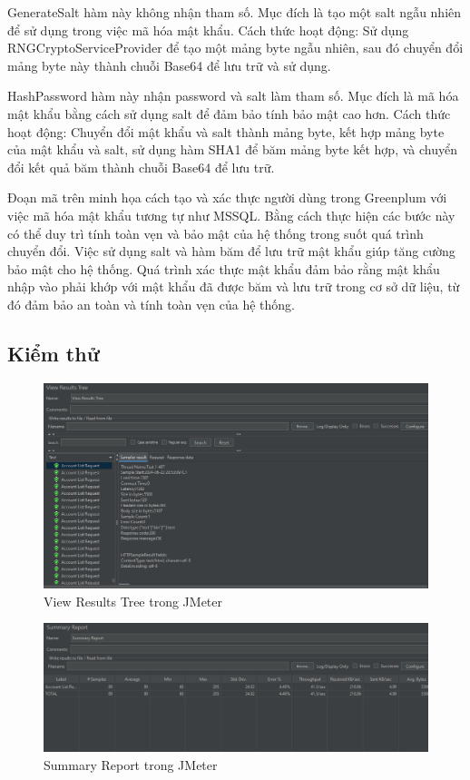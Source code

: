 \documentclass[14pt]{article}
\begin{document}
GenerateSalt hàm này không nhận tham số. Mục đích là tạo một salt ngẫu nhiên để sử dụng trong việc mã hóa mật khẩu. Cách thức hoạt động: Sử dụng RNGCryptoServiceProvider để tạo một mảng byte ngẫu nhiên, sau đó chuyển đổi mảng byte này thành chuỗi Base64 để lưu trữ và sử dụng.


HashPassword hàm này nhận password và salt làm tham số. Mục đích là mã hóa mật khẩu bằng cách sử dụng salt để đảm bảo tính bảo mật cao hơn. Cách thức hoạt động: Chuyển đổi mật khẩu và salt thành mảng byte, kết hợp mảng byte của mật khẩu và salt, sử dụng hàm SHA1 để băm mảng byte kết hợp, và chuyển đổi kết quả băm thành chuỗi Base64 để lưu trữ.

Đoạn mã trên minh họa cách tạo và xác thực người dùng trong Greenplum với việc mã hóa mật khẩu tương tự như MSSQL. Bằng cách thực hiện các bước này có thể duy trì tính toàn vẹn và bảo mật của hệ thống trong suốt quá trình chuyển đổi. Việc sử dụng salt và hàm băm để lưu trữ mật khẩu giúp tăng cường bảo mật cho hệ thống. Quá trình xác thực mật khẩu đảm bảo rằng mật khẩu nhập vào phải khớp với mật khẩu đã được băm và lưu trữ trong cơ sở dữ liệu, từ đó đảm bảo an toàn và tính toàn vẹn của hệ thống.

\subsection{Kiểm thử}


\begin{figure}
    \centering
    \includegraphics[width=0.8\linewidth]{images/vrt.png}
    \caption{View Results Tree trong JMeter}
    \label{fig:vrt}
\end{figure}

\begin{figure}
    \centering
    \includegraphics[width=0.8\linewidth]{images/sr.png}
     \caption{Summary Report trong JMeter}
    \label{fig:sr}
\end{figure}
\end{document}
